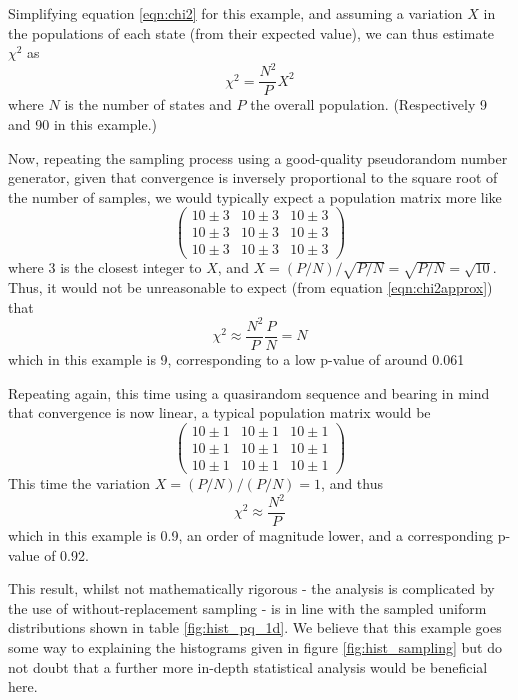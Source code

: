 \documentclass{JASSS}
\begin{document}
Simplifying equation \ref{eqn:chi2} for this example, and assuming a variation \(X\) in the 
populations of each state (from their expected value), we can thus estimate \(\chi^2\) as
\begin{equation}
\chi^2 = \frac{N^2}{P}X^2
\label{eqn:chi2approx}
\end{equation} 
where \(N\) is the number of states and \(P\) the overall population. (Respectively 9 and 90 in this example.)

Now, repeating the sampling process using a good-quality pseudorandom number generator, 
given that convergence is inversely proportional to the square root of the number of samples, 
we would typically expect a population matrix more like
\[\left( \begin{array}{ccc}
10\pm3 & 10\pm3 & 10\pm3 \\
10\pm3 & 10\pm3 & 10\pm3 \\
10\pm3 & 10\pm3 & 10\pm3 \end{array} \right)\]
where 3 is the closest integer to \(X\), and \(X=(P/N)/\sqrt{P/N}=\sqrt{P/N}=\sqrt{10}\). Thus, it would not be unreasonable to expect (from equation \ref{eqn:chi2approx}) that 
\begin{equation}
\chi^2 \approx \frac{N^2}{P}\frac{P}{N}=N
\end{equation}
which in this example is 9, corresponding to a low p-value of around 0.061

Repeating again, this time using a quasirandom sequence and bearing in mind that convergence is now linear, a typical population matrix would be 
\[\left( \begin{array}{ccc}
10\pm1 & 10\pm1 & 10\pm1 \\
10\pm1 & 10\pm1 & 10\pm1 \\
10\pm1 & 10\pm1 & 10\pm1 \end{array} \right)\]
This time the variation \(X=(P/N)/(P/N)=1\), and thus
\begin{equation}
\chi^2 \approx \frac{N^2}{P}
\end{equation}
which in this example is 0.9, an order of magnitude lower, and a corresponding p-value of 0.92.

This result, whilst not mathematically rigorous - the analysis is complicated by the use of without-replacement sampling - is in line with the sampled uniform distributions shown in table \ref{fig:hist_pq_1d}. We believe that this example goes some way to explaining the histograms given in figure \ref{fig:hist_sampling} but do not doubt that a further more in-depth statistical analysis would be beneficial here.
\end{document}
